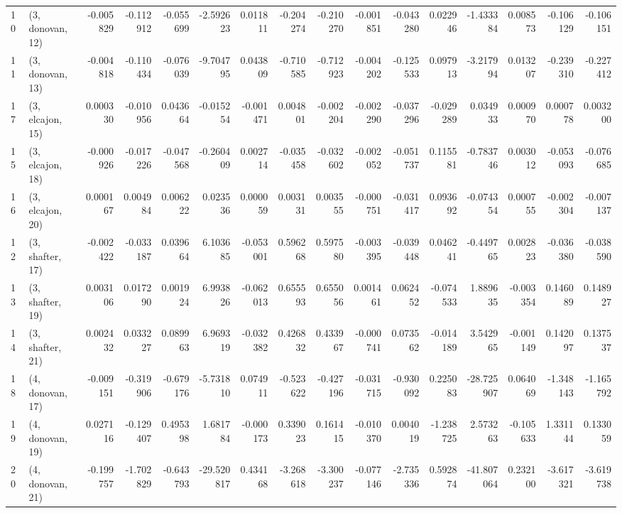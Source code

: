 \begin{tabular}{llrrrrrrrrrrrrrr}
10 &  (3, donovan, 12) &  -0.005829 & -0.112912 & -0.055699 &  -2.592623 &  0.011811 &  -0.204274 & -0.210270 & -0.001851 & -0.043280 &  0.022946 &  -1.433384 &  0.008573 & -0.106129 & -0.106151 \\
11 &  (3, donovan, 13) &  -0.004818 & -0.110434 & -0.076039 &  -9.704795 &  0.043809 &  -0.710585 & -0.712923 & -0.004202 & -0.125533 &  0.097913 &  -3.217994 &  0.013207 & -0.239310 & -0.227412 \\
17 &  (3, elcajon, 15) &   0.000330 & -0.010956 &  0.043664 &  -0.015254 & -0.001471 &   0.004801 & -0.002204 & -0.002290 & -0.037296 & -0.029289 &   0.034933 &  0.000970 &  0.000778 &  0.003200 \\
15 &  (3, elcajon, 18) &  -0.000926 & -0.017226 & -0.047568 &  -0.260409 &  0.002714 &  -0.035458 & -0.032602 & -0.002052 & -0.051737 &  0.115581 &  -0.783746 &  0.003012 & -0.053093 & -0.076685 \\
16 &  (3, elcajon, 20) &   0.000167 &  0.004984 &  0.006222 &   0.023536 &  0.000059 &   0.003131 &  0.003555 & -0.000751 & -0.031417 &  0.093692 &  -0.074354 &  0.000755 & -0.002304 & -0.007137 \\
12 &  (3, shafter, 17) &  -0.002422 & -0.033187 &  0.039664 &   6.103685 & -0.053001 &   0.596268 &  0.597580 & -0.003395 & -0.039448 &  0.046241 &  -0.449765 &  0.002823 & -0.036380 & -0.038590 \\
13 &  (3, shafter, 19) &   0.003106 &  0.017290 &  0.001924 &   6.993826 & -0.062013 &   0.655593 &  0.655056 &  0.001461 &  0.062452 & -0.074533 &   1.889635 & -0.003354 &  0.146089 &  0.148927 \\
14 &  (3, shafter, 21) &   0.002432 &  0.033227 &  0.089963 &   6.969319 & -0.032382 &   0.426832 &  0.433967 & -0.000741 &  0.073562 & -0.014189 &   3.542965 & -0.001149 &  0.142097 &  0.137537 \\
18 &  (4, donovan, 17) &  -0.009151 & -0.319906 & -0.679176 &  -5.731810 &  0.074911 &  -0.523622 & -0.427196 & -0.031715 & -0.930092 &  0.225083 & -28.725907 &  0.064069 & -1.348143 & -1.165792 \\
19 &  (4, donovan, 19) &   0.027116 & -0.129407 &  0.495398 &   1.681784 & -0.000173 &   0.339023 &  0.161415 & -0.010370 &  0.004019 & -1.238725 &   2.573263 & -0.105633 &  1.331144 &  0.133059 \\
20 &  (4, donovan, 21) &  -0.199757 & -1.702829 & -0.643793 & -29.520817 &  0.434168 &  -3.268618 & -3.300237 & -0.077146 & -2.735336 &  0.592874 & -41.807064 &  0.232100 & -3.617321 & -3.619738 \\

\end{tabular}
